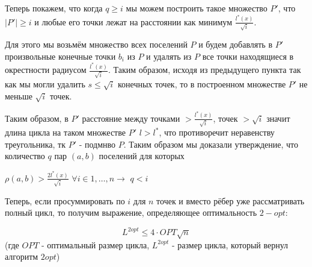 \documentclass[a4paper,12pt]{article}
\begin{document}
Теперь покажем, что когда $q\geq i$ мы можем построить такое множество $P'$, что $|P'|\geq i$ и любые его точки лежат на расстоянии как минимум $\frac{ l^*(x)}{\sqrt{i}}$.

Для этого мы возьмём множество всех поселений $P$ и будем добавлять в $P'$ произвольные конечные точки $b_i$ из $P$ и удалять из $P$ все точки находящиеся в окрестности радиусом $\frac{ l^*(x)}{\sqrt{i}}$. Таким образом, исходя из предыдущего пункта так как мы могли удалить $s\leq\sqrt{i}$ конечных точек, то в построенном множестве $P'$ не меньше $\sqrt{i}$ точек.

Таким образом, в $P'$ расстояние между точками $>\frac{ l^*(x)}{\sqrt{i}}$, точек $>\sqrt{i}$ значит длина цикла на таком множестве $P'$ $l>l^*$, что противоречит неравенству треугольника, тк $P'$ - подмнво $P$. Таким образом мы доказали утверждение, что количество $q$ пар $(a,b)$ поселений для которых 

$\rho(a,b)>\frac{2 l^*(x)}{\sqrt{i}}$ $\forall i \in 1, \dots, n \rightarrow$ $q<i$

Теперь, если просуммировать по $i$ для $n$ точек и вместо рёбер уже рассматривать полный цикл, то получим выражение, определяющее оптимальность $2-opt$:

$$L^{2opt}\leq 4\cdot OPT\sqrt{n}$$(где $OPT$ - оптимальный размер цикла, $L^{2opt}$ - размер цикла, который вернул алгоритм $2opt$)
\end{document}
